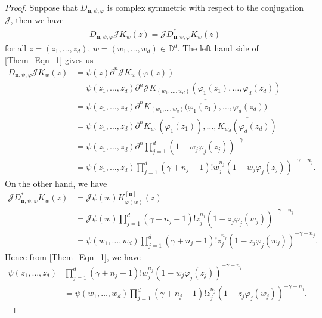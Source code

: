 \documentclass[10pt,a4paper]{amsart}
\newcommand{\mfn}{\mathbf n}
\begin{document}
\begin{proof}
        Suppose that $D_{\mfn,\psi,\varphi}$ is complex symmetric with respect to the conjugation $\mathcal{J}$, then we have
    \begin{align}\label{Them_Eqn_1}
         D_{\mfn,\psi, \varphi}\mathcal{J}K_w(z)= \mathcal{J}D_{\mfn,\psi, \varphi}^*K_w(z)
    \end{align}
    for all $z=(z_1, \dots, z_d)$, $w=(w_1, \dots, w_d)\in \mathbb{D}^d$.
    The left hand side of \eqref{Them_Eqn_1} gives us 
    \begin{align}\label{Them_Eqn_2}
         D_{\mfn,\psi, \varphi}\mathcal{J}K_w(z)&=\psi(z)\partial^n\mathcal{J}K_w(\varphi(z))\nonumber\\
         &=\psi(z_1, \dots, z_d)\partial^n\mathcal{J}K_{(w_1, \dots, w_d)}(\varphi_1(z_1), \dots, \varphi_d(z_d))\nonumber\\
         &=\psi(z_1, \dots, z_d)\partial^n\overline{K_{(w_1, \dots, w_d)}(\overline{\varphi_1(z_1)}, \dots, \overline{\varphi_d(z_d))}}\nonumber\\
          &=\psi(z_1, \dots, z_d)\partial^n\overline{K_{w_1}(\overline{\varphi_1(z_1)})},\dots, \overline{K_{w_d}(\overline{\varphi_d(z_d)})}\nonumber\\
           &=\psi(z_1, \dots, z_d)\partial^n\prod_{j=1}^d(1-w_j\varphi_j(z_j))^{-\gamma}\nonumber\\
            &=\psi(z_1, \dots, z_d)\prod_{j=1}^d(\gamma+n_j-1)!w_j^{n_j}(1-w_j\varphi_j(z_j))^{-\gamma-n_j}.
    \end{align}
    On the other hand, we have 
    \begin{align}\label{Them_Eqn_3}
    	\mathcal{J} D_{\mfn,\psi, \varphi}^*K_w(z)&=\mathcal{J}\overline{\psi(w)}K_{\varphi(w)}^{[\mfn]}(z)\nonumber\\
    	&=\mathcal{J}\overline{\psi(w)}\prod_{j=1}^d(\gamma+n_j-1)!z_j^{n_j}(1-z_j\overline{\varphi_j(w_j)})^{-\gamma-n_j}\nonumber\\
    	&=\psi(w_1, \dots, w_d)\prod_{j=1}^d(\gamma+n_j-1)!z_j^{n_j}(1-z_j\varphi_j(w_j))^{-\gamma-n_j}.
    \end{align}
    Hence from \eqref{Them_Eqn_1}, we have 
    \begin{align}\label{Them_Eqn_4}
    \psi(z_1, \dots, z_d)&\prod_{j=1}^d(\gamma+n_j-1)!w_j^{n_j}(1-w_j\varphi_j(z_j))^{-\gamma-n_j}\nonumber\\
    &=\psi(w_1, \dots, w_d)\prod_{j=1}^d(\gamma+n_j-1)!z_j^{n_j}(1-z_j\varphi_j(w_j))^{-\gamma-n_j}.
    \end{align}

\end{proof}
\end{document}

